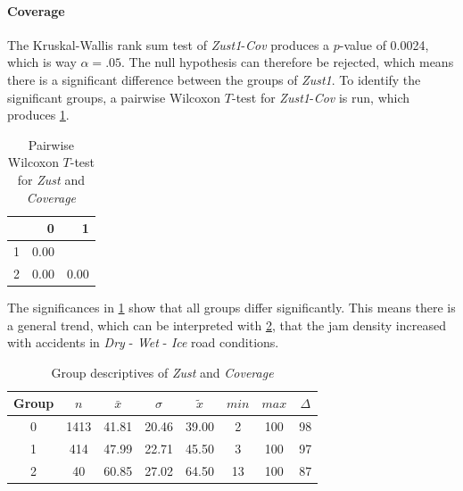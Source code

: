 \paragraph{Coverage}
The Kruskal-Wallis rank sum test of \textit{Zust1}-\textit{Cov} produces a $p$-value of 0.0024, which is way $\alpha=.05$. The null hypothesis can therefore be rejected, which means there is a significant difference between the groups of \textit{Zust1}. To identify the significant groups, a pairwise Wilcoxon $T$-test for \textit{Zust1}-\textit{Cov} is run, which produces \cref{tbl:wilcoxon_baysis_matched_Zust_Cov}. 
\begin{table}[ht!]
	\tiny
	\centering
    \begin{tabular}{rrr}
        \toprule
        & 0 & 1 \\ 
        \midrule
        1 & 0.00 &  \\ 
        2 & 0.00 & 0.00 \\ 
        \bottomrule
      \end{tabular}
	\caption{Pairwise Wilcoxon $T$-test for \textit{Zust} and \textit{Coverage}}
	\label{tbl:wilcoxon_baysis_matched_Zust_Cov}
\end{table}
The significances in \cref{tbl:wilcoxon_baysis_matched_Zust_Cov} show that all groups differ significantly. This means there is a general trend, which can be interpreted with \cref{tbl:descriptives_baysis_matched_Zust_Cov}, that the jam density increased with accidents in \textit{Dry} - \textit{Wet} - \textit{Ice} road conditions.
\begin{table}[ht!]
	\tiny
	\centering
    \begin{tabular}{c|c|c|c|c|c|c|c}
        \toprule
        Group & $n$ & $\bar{x}$ & $\sigma$ & $\tilde{x}$ & $min$ & $max$ & $\Delta$ \\ 
        \midrule
        0 & 1413 & 41.81 & 20.46 & 39.00 & 2  & 100 & 98 \\ 
        1 & 414  & 47.99 & 22.71 & 45.50 & 3  & 100 & 97 \\ 
        2 & 40   & 60.85 & 27.02 & 64.50 & 13 & 100 & 87 \\ 
        \bottomrule
      \end{tabular}
	\caption{Group descriptives of \textit{Zust} and \textit{Coverage}}
	\label{tbl:descriptives_baysis_matched_Zust_Cov}
\end{table}

